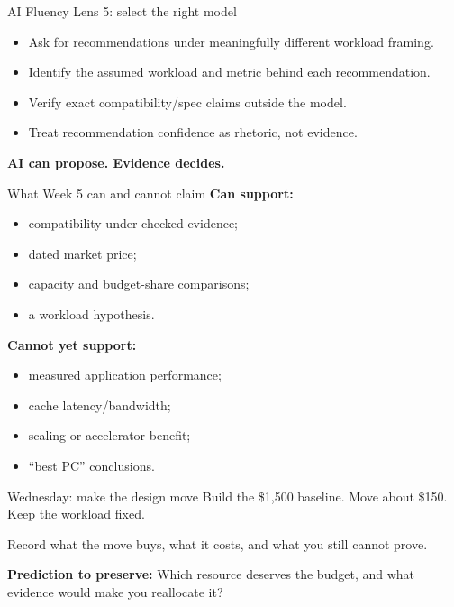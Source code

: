 \documentclass{beamer}
\begin{document}
\begin{frame}{AI Fluency Lens 5: select the right model}
\begin{itemize}
  \item Ask for recommendations under meaningfully different workload framing.
  \item Identify the assumed workload and metric behind each recommendation.
  \item Verify exact compatibility/spec claims outside the model.
  \item Treat recommendation confidence as rhetoric, not evidence.
\end{itemize}

\vspace{1em}
\centering
\textbf{AI can propose. Evidence decides.}
\end{frame}

\begin{frame}{What Week 5 can and cannot claim}
\textbf{Can support:}
\begin{itemize}
  \item compatibility under checked evidence;
  \item dated market price;
  \item capacity and budget-share comparisons;
  \item a workload hypothesis.
\end{itemize}

\textbf{Cannot yet support:}
\begin{itemize}
  \item measured application performance;
  \item cache latency/bandwidth;
  \item scaling or accelerator benefit;
  \item ``best PC'' conclusions.
\end{itemize}
\end{frame}

\begin{frame}{Wednesday: make the design move}
\Large
Build the \$1,500 baseline. Move about \$150. Keep the workload fixed.

\vspace{1em}
\normalsize
Record what the move buys, what it costs, and what you still cannot prove.

\vspace{1em}
\textbf{Prediction to preserve:} Which resource deserves the budget, and what evidence would make you reallocate it?
\end{frame}
\end{document}
